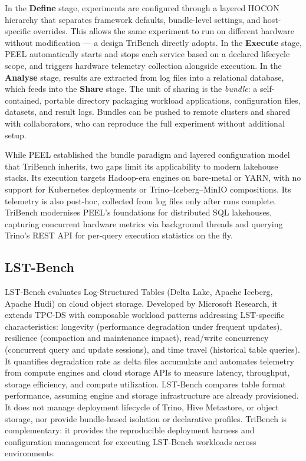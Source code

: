 \documentclass{l4proj}
\begin{document}
In the \textbf{Define} stage, experiments are configured through a layered HOCON \citep{hocon} hierarchy that separates framework defaults, bundle-level settings, and host-specific overrides. This allows the same experiment to run on different hardware without modification --- a design TriBench directly adopts. In the \textbf{Execute} stage, PEEL automatically starts and stops each service based on a declared lifecycle scope, and triggers hardware telemetry collection alongside execution. In the \textbf{Analyse} stage, results are extracted from log files into a relational database, which feeds into the \textbf{Share} stage. The unit of sharing is the \emph{bundle}: a self-contained, portable directory packaging workload applications, configuration files, datasets, and result logs. Bundles can be pushed to remote clusters and shared with collaborators, who can reproduce the full experiment without additional setup.

While PEEL established the bundle paradigm and layered configuration model that TriBench inherits, two gaps limit its applicability to modern lakehouse stacks. Its execution targets Hadoop-era engines on bare-metal or YARN, with no support for Kubernetes deployments or Trino--Iceberg--MinIO compositions. Its telemetry is also post-hoc, collected from log files only after runs complete. TriBench modernises PEEL's foundations for distributed SQL lakehouses, capturing concurrent hardware metrics via background threads and querying Trino's REST API for per-query execution statistics on the fly.



\subsection{LST-Bench}
\label{sec:lstbench}

LST-Bench \citep{2024lstbench} evaluates Log-Structured Tables (Delta Lake, Apache Iceberg, Apache Hudi) on cloud object storage. Developed by Microsoft Research, it extends TPC-DS with composable workload patterns addressing LST-specific characteristics: longevity (performance degradation under frequent updates), resilience (compaction and maintenance impact), read/write concurrency (concurrent query and update sessions), and time travel (historical table queries). It quantifies degradation rate as delta files accumulate and automates telemetry from compute engines and cloud storage APIs to measure latency, throughput, storage efficiency, and compute utilization. LST-Bench compares table format performance, assuming engine and storage infrastructure are already provisioned. It does not manage deployment lifecycle of Trino, Hive Metastore, or object storage, nor provide bundle-based isolation or declarative profiles. TriBench is complementary: it provides the reproducible deployment harness and configuration management for executing LST-Bench workloads across environments.
\end{document}
